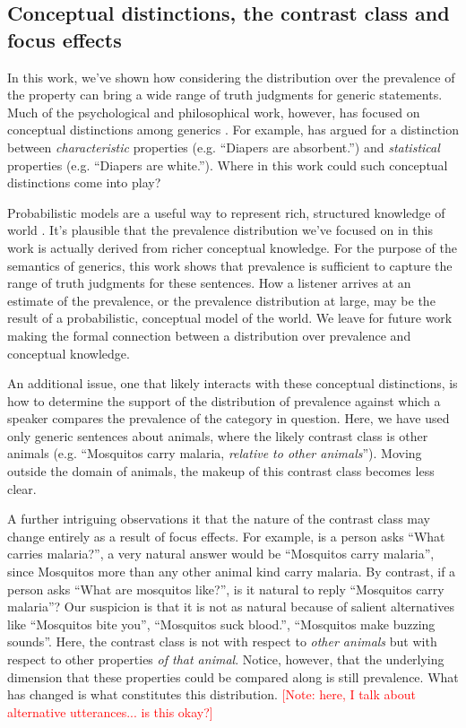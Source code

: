 \documentclass[10pt,letterpaper]{article}
\newcommand{\red}[1]{\textcolor{Red}{#1}}
\begin{document}
\subsection{Conceptual distinctions, the contrast class and focus effects}

In this work, we've shown how considering the distribution over the prevalence of the property can bring a wide range of truth judgments for generic statements. Much of the psychological and philosophical work, however, has focused on conceptual distinctions among generics \cite{Prasada2013, Leslie2007}. For example, \citeauthor{Prasada2013} has argued for a distinction between \emph{characteristic} properties (e.g. ``Diapers are absorbent.'') and \emph{statistical} properties (e.g. ``Diapers are white.''). Where in this work could such conceptual distinctions come into play?

Probabilistic models are a useful way to represent rich, structured knowledge of world \cite{Goodman2015concepts}. It's plausible that the prevalence distribution we've focused on in this work is actually derived from richer conceptual knowledge. For the purpose of the semantics of generics, this work shows that prevalence is sufficient to capture the range of truth judgments for these sentences. How a listener arrives at an estimate of the prevalence, or the prevalence distribution at large, may be the result of a probabilistic, conceptual model of the world. We leave for future work making the formal connection between a distribution over prevalence and conceptual knowledge.

An additional issue, one that likely interacts with these conceptual distinctions, is how to determine the support of the distribution of prevalence against which a speaker compares the  prevalence of the category in question. Here, we have used only generic sentences about animals, where the likely contrast class is other animals (e.g. ``Mosquitos carry malaria, \emph{relative to other animals}''). Moving outside the domain of animals, the makeup of this contrast class becomes less clear. 

A further intriguing observations it that the nature of the contrast class may change entirely as a result of focus effects. For example, is a person asks ``What carries malaria?'', a very natural answer would be ``Mosquitos carry malaria'', since Mosquitos more than any other animal kind carry malaria. By contrast, if a person asks ``What are mosquitos like?'', is it natural to reply ``Mosquitos carry malaria''? Our suspicion is that it is not as natural because of salient alternatives like ``Mosquitos bite you'', ``Mosquitos suck blood.'', ``Mosquitos make buzzing sounds''. Here, the contrast class is not with respect to \emph{other animals} but with respect to other properties \emph{of that animal}. Notice, however, that the underlying dimension that these properties could be compared along is still prevalence. What has changed is what constitutes this distribution. \red{[Note: here, I talk about alternative utterances... is this okay?]}
\end{document}
